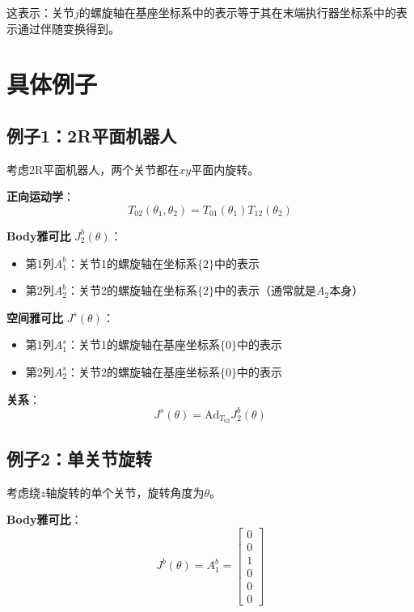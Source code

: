 \documentclass[12pt,a4paper]{article}
\begin{document}
这表示：关节$j$的螺旋轴在基座坐标系中的表示等于其在末端执行器坐标系中的表示通过伴随变换得到。

\section{具体例子}

\subsection{例子1：2R平面机器人}

考虑2R平面机器人，两个关节都在$xy$平面内旋转。

\textbf{正向运动学}：
\begin{equation}
T_{02}(\theta_1, \theta_2) = T_{01}(\theta_1) T_{12}(\theta_2)
\end{equation}

\textbf{Body雅可比} $J_2^b(\theta)$：

\begin{itemize}
\item 第1列$A_1^b$：关节1的螺旋轴在坐标系$\{2\}$中的表示
\item 第2列$A_2^b$：关节2的螺旋轴在坐标系$\{2\}$中的表示（通常就是$A_2$本身）
\end{itemize}

\textbf{空间雅可比} $J^s(\theta)$：

\begin{itemize}
\item 第1列$A_1^s$：关节1的螺旋轴在基座坐标系$\{0\}$中的表示
\item 第2列$A_2^s$：关节2的螺旋轴在基座坐标系$\{0\}$中的表示
\end{itemize}

\textbf{关系}：
\begin{equation}
J^s(\theta) = \text{Ad}_{T_{02}} J_2^b(\theta)
\end{equation}

\subsection{例子2：单关节旋转}

考虑绕$z$轴旋转的单个关节，旋转角度为$\theta$。

\textbf{Body雅可比}：
\begin{equation}
J^b(\theta) = A_1^b = \begin{bmatrix} 0 \\ 0 \\ 1 \\ 0 \\ 0 \\ 0 \end{bmatrix}
\end{equation}
\end{document}

